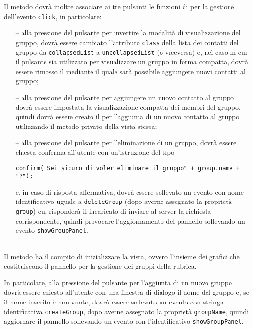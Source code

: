 \begin{description}
  Il metodo dovrà inoltre associare ai tre pulsanti le funzioni di  per la gestione dell'evento \verb'click', in particolare:
  \begin{itemize}
    \item[--] alla pressione del pulsante per invertire la modalità di visualizzazione del gruppo, dovrà essere cambiato l'attributo \verb'class' della lista dei contatti del gruppo da \verb'collapsedList' a \verb'uncollapsedList' (o viceversa) e, nel caso in cui il pulsante sia utilizzato per visualizzare un gruppo in forma compatta, dovrà essere rimosso il  mediante il quale sarà possibile aggiungere nuovi contatti al gruppo;
    \item[--] alla pressione del pulsante per aggiungere un nuovo contatto al gruppo dovrà essere impostata la visualizzazione compatta dei membri del gruppo, quindi dovrà essere creato il  per l'aggiunta di un nuovo contatto al gruppo utilizzando il metodo privato  della vista stessa;
    \item[--] alla pressione del pulsante per l'eliminazione di un gruppo, dovrà essere chiesta conferma all'utente con un'istruzione del tipo
    \begin{verbatim}
confirm("Sei sicuro di voler eliminare il gruppo" + group.name + "?");
    \end{verbatim}
    e, in caso di risposta affermativa, dovrà essere sollevato un evento con nome identificativo uguale a \verb'deleteGroup' (dopo averne assegnato la proprietà \verb'group') cui risponderà il  incaricato di inviare al server la richiesta corrispondente, quindi provocare l'aggiornamento del pannello sollevando un evento \verb'showGroupPanel'.
  \end{itemize}
  
  \item{}\\
  Il metodo ha il compito di inizializzare la vista, ovvero l'insieme dei  grafici che costituiscono il pannello per la gestione dei gruppi della rubrica.
  
  In particolare, alla pressione del pulsante per l'aggiunta di un nuovo gruppo dovrà essere chiesto all'utente con una finestra di dialogo il nome del gruppo e, se il nome inserito è non vuoto,  dovrà essere sollevato un evento con stringa identificativa \verb'createGroup', dopo averne assegnato la proprietà \verb'groupName', quindi aggiornare il pannello sollevando un evento con l'identificativo \verb'showGroupPanel'.
  

\end{description}
